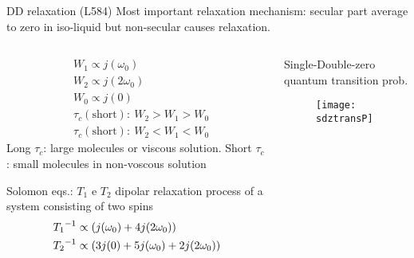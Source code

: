 \begin{frame}{DD relaxation (L584)}
Most important relaxation mechanism: secular part average to zero in iso-liquid but non-secular causes relaxation.
\begin{columns}[T]
\begin{column}{0.6\textwidth}
\begin{align*}
&W_1\propto j(\omega_0)\\
&W_2\propto j(2\omega_0)\\
&W_0\propto j(0)\\
&\tau_c(\text{short}):\ W_2>W_1>W_0\\
&\tau_c(\text{short}):\ W_2<W_1<W_0
\end{align*}
Long $\tau_c$: large molecules or viscous solution. Short $\tau_c$: small molecules in non-voscous solution
\begin{block}{Solomon eqs.: $T_1$ e $T_2$}
dipolar relaxation process of a system consisting of two spins
\begin{align*}
&{T_1}^{-1}\propto(j(\omega_0)+4j(2\omega_0))\\
&{T_2}^{-1}\propto(3j(0)+5j(\omega_0)+2j(2\omega_0))
\end{align*}
\end{block}
\end{column}
\begin{column}{0.4\textwidth}
\begin{block}{Single-Double-zero quantum transition prob.}
\begin{figure}[!ht]
    \centering
    \texttt{[image: sdztransP]}
    \label{fig:sdztransP}
\end{figure}

\end{block}
\end{column}
\end{columns}
\end{frame}